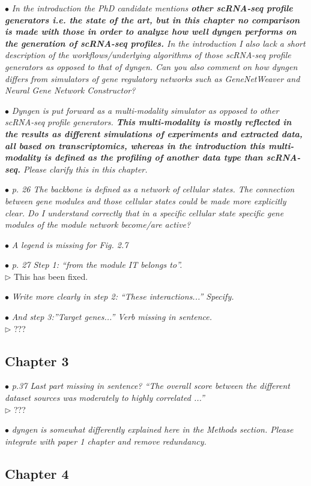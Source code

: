 \documentclass[10pt]{article}
\newcommand{\exam}[2][\  ]{\hspace{0pt}\marginpar{\color{myred}#1}$\bullet$ \textit{#2}}
\newcommand{\imp}[1]{\textbf{#1}}
\newcommand{\answ}[1]{{\color{myblue} $\triangleright$ #1}}
\newcommand{\bigexclaim}{\raisebox{-0.1em}{\BigTriangleUp}\hspace{-0.32em}\llap{\small\textbf{!}}\hspace{0.32em}}
\newcommand{\tagimp}{\bigexclaim}
\newcommand{\tagtime}{{\Large $\hourglass$}}
\begin{document}
\exam[\tagimp \tagtime]{In the introduction the PhD candidate mentions \imp{other scRNA-seq profile generators i.e. the
state of the art, but in this chapter no comparison is made with those in order to analyze how
well dyngen performs on the generation of scRNA-seq profiles.} In the introduction I also lack
a short description of the workflows/underlying algorithms of those scRNA-seq profile
generators as opposed to that of dyngen. Can you also comment on how dyngen differs from
simulators of gene regulatory networks such as GeneNetWeaver and Neural Gene Network
Constructor?}

\exam[\tagimp]{Dyngen is put forward as a multi-modality simulator as opposed to other scRNA-seq profile
generators. \imp{This multi-modality is mostly reflected in the results as different simulations of
experiments and extracted data, all based on transcriptomics, whereas in the introduction
this multi-modality is defined as the profiling of another data type than scRNA-seq.} Please
clarify this in this chapter.}


\exam{p. 26 The backbone is defined as a network of cellular states. The connection between gene
modules and those cellular states could be made more explicitly clear. Do I understand
correctly that in a specific cellular state specific gene modules of the module network
become/are active?}

\exam{A legend is missing for Fig. 2.7}

\exam{p. 27 Step 1: “from the module IT belongs to”.} \\
\answ{This has been fixed.}

\exam{Write more clearly in step 2: “These
interactions...” Specify.}

\exam{And step 3:”Target genes...” Verb missing in sentence.} \\
\answ{???}

\subsection{Chapter 3}

\exam{p.37 Last part missing in sentence? “The overall score between the different dataset sources
	was moderately to highly correlated ...”} \\
\answ{???}

\exam{dyngen is somewhat differently explained here in the Methods section. Please integrate with
	paper 1 chapter and remove redundancy.}

\subsection{Chapter 4}
\end{document}
